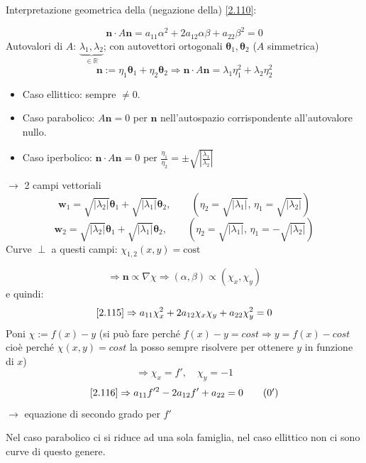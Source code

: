 \documentclass[a4paper,11pt]{report}
\newcommand{\vect}[1]{\boldsymbol{#1}}
\newcommand{\R}{\mathbb{R}}
\begin{document}
Interpretazione geometrica della (negazione della) \eqref{2.110}:

\begin{equation}
\vect{n}\cdot A\vect{n}=a_{11}\alpha^2+2a_{12}\alpha\beta + a_{22}\beta^2=0
\label{2.115}
\end{equation}
Autovalori di $A$: $\underbrace{\lambda_1,\lambda_2}_{\in\R}$; con autovettori ortogonali $\vect{\theta}_1,\vect{\theta}_2$ ($A$ simmetrica)
\[
\vect{n}:= \eta_1 \vect{\theta}_1 + \eta_2\vect{\theta}_2 \Rightarrow \vect{n}\cdot A \vect{n}=\lambda_1\eta_1^2 + \lambda_2\eta_2^2
\]
\begin{itemize}
\item Caso ellittico: sempre $\neq 0$.
\item Caso parabolico: $A\vect{n}=0$ per $\vect{n}$ nell'autospazio corrispondente all'autovalore nullo.
\item Caso iperbolico: $\vect{n}\cdot A\vect{n} = 0$ per $\frac{\eta_1}{\eta_2}=\pm \sqrt{\left|\frac{\lambda_1}{\lambda_2}\right|}$
\end{itemize}
$\rightarrow$ 2 campi vettoriali
\[
\vect{w}_1 = \sqrt{|\lambda_2|}\vect{\theta}_1 + \sqrt{|\lambda_1|}\vect{\theta}_2, \qquad (\eta_2=\sqrt{|\lambda_1|},\, \eta_1=\sqrt{|\lambda_2|})
\]
\[
\vect{w}_2 = \sqrt{|\lambda_2|}\vect{\theta}_1 + \sqrt{|\lambda_1|}\vect{\theta}_2, \qquad (\eta_2=\sqrt{|\lambda_1|},\, \eta_1=-\sqrt{|\lambda_2|})
\]
Curve $\perp$ a questi campi: $\chi_{1,2}(x,y)=\text{cost}$


\[
\Rightarrow \vect{n} \propto \nabla\chi \Rightarrow (\alpha,\beta) \propto (\chi_x, \chi_y)
\]
e quindi:
\begin{equation}
\eqref{2.115} \Rightarrow a_{11}\chi_x^2 + 2a_{12}\chi_x\chi_y + a_{22}\chi_y^2 =0
\label{2.116}
\end{equation}
Poni $\chi := f(x)-y$ (si pu\`o fare perch\'e $f(x)-y=cost \Rightarrow y=f(x) - cost$ cio\`e perch\'e $\chi(x,y)=cost$ la posso sempre risolvere per ottenere $y$ in funzione di $x$)
\[
\Rightarrow \chi_x = f', \quad \chi_y=-1
\]
\begin{equation}
\eqref{2.116}\Rightarrow a_{11}f'^2 - 2 a_{12}f' + a_{22}=0
\label{2.116'}
\tag{$\theequation^\prime$}
\end{equation}
$\rightarrow$ equazione di secondo grado per $f'$

Nel caso parabolico ci si riduce ad una sola famiglia, nel caso ellittico non ci sono curve di questo genere.
\end{document}
